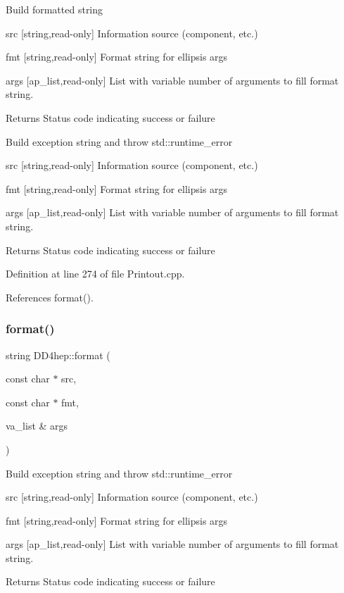 Build formatted string \begin{DoxyItemize}
\item src \mbox{[}string,read-\/only\mbox{]} Information source (component, etc.) \item fmt \mbox{[}string,read-\/only\mbox{]} Format string for ellipsis args \item args \mbox{[}ap\+\_\+list,read-\/only\mbox{]} List with variable number of arguments to fill format string. \begin{DoxyReturn}{Returns}
Status code indicating success or failure
\end{DoxyReturn}
Build exception string and throw std\+::runtime\+\_\+error \item src \mbox{[}string,read-\/only\mbox{]} Information source (component, etc.) \item fmt \mbox{[}string,read-\/only\mbox{]} Format string for ellipsis args \item args \mbox{[}ap\+\_\+list,read-\/only\mbox{]} List with variable number of arguments to fill format string. \begin{DoxyReturn}{Returns}
Status code indicating success or failure 
\end{DoxyReturn}
\end{DoxyItemize}


Definition at line 274 of file Printout.\+cpp.



References format().

\hypertarget{namespace_d_d4hep_a2d9fc6b33e6b8890a8974aa6ccee4b1c}{}\label{namespace_d_d4hep_a2d9fc6b33e6b8890a8974aa6ccee4b1c} 
\subsubsection{\texorpdfstring{format()}{format()}\hspace{0.1cm}{\footnotesize\ttfamily [4/4]}}
{\footnotesize\ttfamily string D\+D4hep\+::format (\begin{DoxyParamCaption}\item[{const char $\ast$}]{src,  }\item[{const char $\ast$}]{fmt,  }\item[{va\+\_\+list \&}]{args }\end{DoxyParamCaption})}

Build exception string and throw std\+::runtime\+\_\+error \begin{DoxyItemize}
\item src \mbox{[}string,read-\/only\mbox{]} Information source (component, etc.) \item fmt \mbox{[}string,read-\/only\mbox{]} Format string for ellipsis args \item args \mbox{[}ap\+\_\+list,read-\/only\mbox{]} List with variable number of arguments to fill format string. \begin{DoxyReturn}{Returns}
Status code indicating success or failure 
\end{DoxyReturn}
\end{DoxyItemize}


